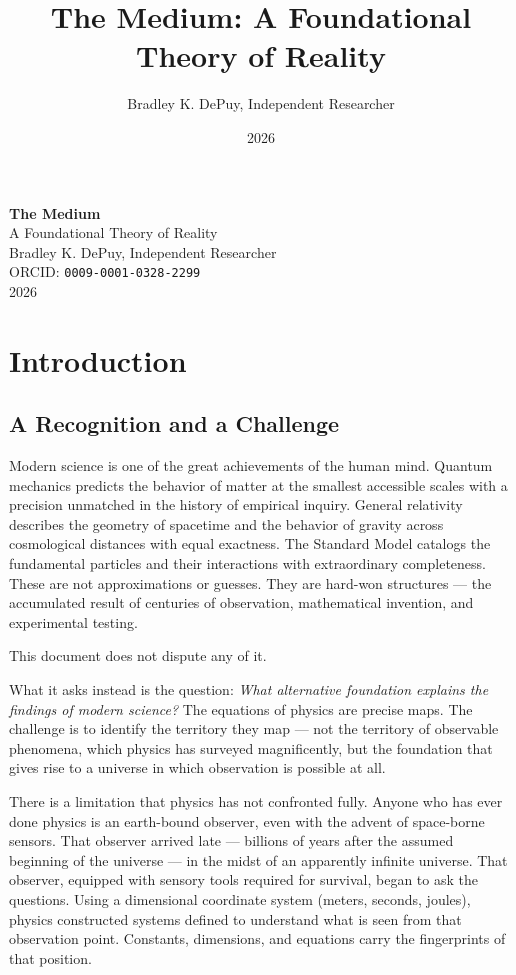 \documentclass[11pt,letterpaper]{article}
\author{Bradley K. DePuy, Independent Researcher}
\date{2026}
\title{The Medium: A Foundational Theory of Reality}
\begin{document}
\pagestyle{plain}
\begin{titlepage}
\vspace*{4cm}
\begin{center}
  {\LARGE\bfseries The Medium}\\[0.6em]
  {\large A Foundational Theory of Reality}\\[2.5em]
  {\normalsize Bradley K. DePuy, Independent Researcher}\\[0.5em]
  {\normalsize ORCID: \mbox{\texttt{0009-0001-0328-2299}}}\\[0.5em]
  {\normalsize 2026}
\end{center}
\end{titlepage}

\pagestyle{body}
\section{Introduction}
\label{sec:org938fd6b}
\subsection{A Recognition and a Challenge}
\label{sec:org072c98e}

Modern science is one of the great achievements of the human mind. Quantum mechanics predicts the behavior of matter at the smallest accessible scales with a precision unmatched in the history of empirical inquiry. General relativity describes the geometry of spacetime and the behavior of gravity across cosmological distances with equal exactness. The Standard Model catalogs the fundamental particles and their interactions with extraordinary completeness. These are not approximations or guesses. They are hard-won structures --- the accumulated result of centuries of observation, mathematical invention, and experimental testing.

This document does not dispute any of it.

What it asks instead is the question: \emph{What alternative foundation explains the findings of modern science?} The equations of physics are precise maps. The challenge is to identify the territory they map --- not the territory of observable phenomena, which physics has surveyed magnificently, but the foundation that gives rise to a universe in which observation is possible at all.

There is a limitation that physics has not confronted fully. Anyone who has ever done physics is an earth-bound observer, even with the advent of space-borne sensors. That observer arrived late --- billions of years after the assumed beginning of the universe --- in the midst of an apparently infinite universe. That observer, equipped with sensory tools required for survival, began to ask the questions. Using a dimensional coordinate system (meters, seconds, joules), physics constructed systems defined to understand what is seen from that observation point. Constants, dimensions, and equations carry the fingerprints of that position.
\end{document}
